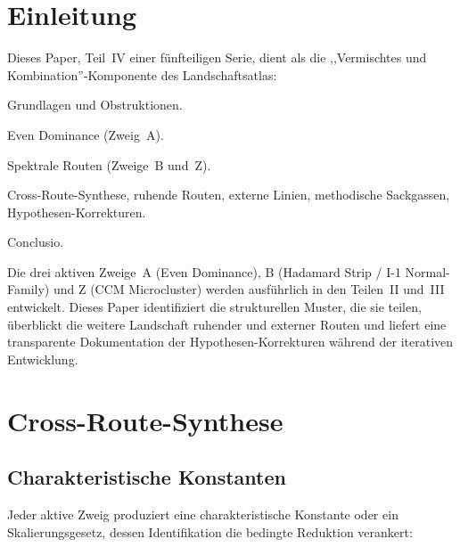 \documentclass[12pt,a4paper]{article}
\theoremstyle{definition}
\theoremstyle{remark}
\begin{document}
\clearpage
\tableofcontents
\clearpage


\section{Einleitung}
\label{sec:intro}

Dieses Paper, Teil~IV einer fünfteiligen Serie, dient als die
,,Vermischtes und Kombination''-Komponente des Landschaftsatlas:
\begin{description}[font=\bfseries,leftmargin=2em]
  \item[Teil~I \cite{Geiger2026partI}:] Grundlagen und Obstruktionen.
  \item[Teil~II \cite{Geiger2026partII}:] Even Dominance (Zweig~A).
  \item[Teil~III \cite{Geiger2026partIII}:] Spektrale Routen
    (Zweige~B und~Z).
  \item[Teil~IV (dieses Paper):] Cross-Route-Synthese, ruhende Routen,
    externe Linien, methodische Sackgassen, Hypothesen-Korrekturen.
  \item[Teil~V \cite{Geiger2026partV}:] Conclusio.
\end{description}

Die drei aktiven Zweige~A (Even Dominance), B (Hadamard Strip / I-1
Normal-Family) und Z (CCM Microcluster) werden ausführlich in den
Teilen~II und~III entwickelt. Dieses Paper identifiziert die strukturellen
Muster, die sie teilen, überblickt die weitere Landschaft ruhender und
externer Routen und liefert eine transparente Dokumentation der
Hypothesen-Korrekturen während der iterativen Entwicklung.


\section{Cross-Route-Synthese}
\label{sec:cross-route}

\subsection{Charakteristische Konstanten}

Jeder aktive Zweig produziert eine charakteristische Konstante oder ein
Skalierungsgesetz, dessen Identifikation die bedingte Reduktion verankert:
\end{document}
